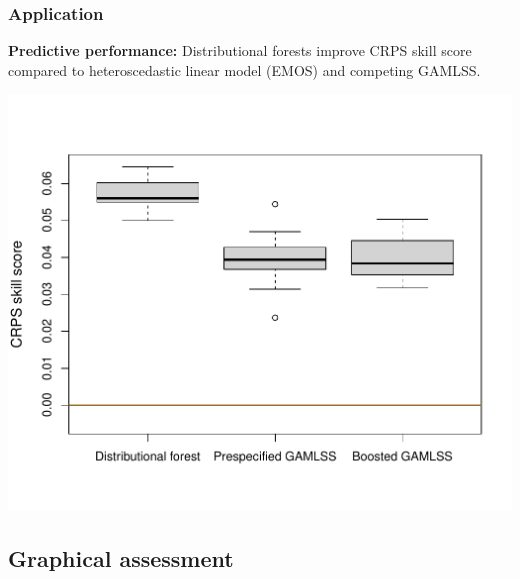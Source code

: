 \documentclass[11pt,t,usepdftitle=false,aspectratio=169]{beamer}
\begin{document}
\begin{frame}[fragile]
\frametitle{Application}

\vspace{-0.75em}

\textbf{Predictive performance:} Distributional forests improve CRPS skill score compared to heteroscedastic linear model (EMOS) and competing GAMLSS. 

\begin{center}
\vspace{-0.8cm}
\includegraphics{slides-rain_cross_axams_crps_skills_score}
\end{center}

\end{frame}


\subsection{Graphical assessment}

\end{document}
